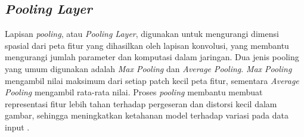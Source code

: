 \subsection{\textit{Pooling Layer}}
Lapisan \textit{pooling}, atau \textit{Pooling Layer}, digunakan untuk mengurangi dimensi spasial dari peta fitur yang dihasilkan oleh lapisan konvolusi, yang membantu mengurangi jumlah parameter dan komputasi dalam jaringan. Dua jenis pooling yang umum digunakan adalah \textit{Max Pooling} dan \textit{Average Pooling}. \textit{Max Pooling} mengambil nilai maksimum dari setiap patch kecil peta fitur, sementara \textit{Average Pooling} mengambil rata-rata nilai. Proses \textit{pooling} membantu membuat representasi fitur lebih tahan terhadap pergeseran dan distorsi kecil dalam gambar, sehingga meningkatkan ketahanan model terhadap variasi pada data input \cite{Goodfellow-et-al-2016}.
